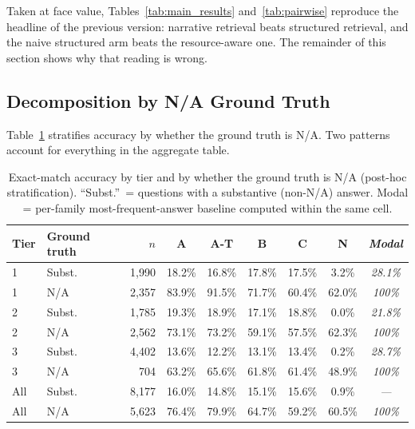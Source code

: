 Taken at face value, Tables~\ref{tab:main_results} and~\ref{tab:pairwise} reproduce the
headline of the previous version: narrative retrieval beats structured retrieval, and
the naive structured arm beats the resource-aware one.  The remainder of this section
shows why that reading is wrong.

\subsection{Decomposition by N/A Ground Truth}
\label{sec:results:na}

Table~\ref{tab:na_split} stratifies accuracy by whether the ground truth is N/A.  Two
patterns account for everything in the aggregate table.

\begin{table}[htbp]
\centering
\small
\caption{Exact-match accuracy by tier and by whether the ground truth is N/A
(post-hoc stratification).  ``Subst.''\ = questions with a substantive (non-N/A)
answer.  Modal = per-family most-frequent-answer baseline computed within the same
cell.}
\label{tab:na_split}
\begin{tabular}{llrccccc>{\itshape}c}
\toprule
Tier & Ground truth & $n$ & A & A-T & B & C & N & Modal \\
\midrule
1 & Subst. & 1{,}990 & 18.2\% & 16.8\% & 17.8\% & 17.5\% & 3.2\% & 28.1\% \\
1 & N/A    & 2{,}357 & 83.9\% & 91.5\% & 71.7\% & 60.4\% & 62.0\% & 100\% \\
2 & Subst. & 1{,}785 & 19.3\% & 18.9\% & 17.1\% & 18.8\% & 0.0\% & 21.8\% \\
2 & N/A    & 2{,}562 & 73.1\% & 73.2\% & 59.1\% & 57.5\% & 62.3\% & 100\% \\
3 & Subst. & 4{,}402 & 13.6\% & 12.2\% & 13.1\% & 13.4\% & 0.2\% & 28.7\% \\
3 & N/A    &   704   & 63.2\% & 65.6\% & 61.8\% & 61.4\% & 48.9\% & 100\% \\
\midrule
All & Subst. & 8{,}177 & 16.0\% & 14.8\% & 15.1\% & 15.6\% & 0.9\% & --- \\
All & N/A    & 5{,}623 & 76.4\% & 79.9\% & 64.7\% & 59.2\% & 60.5\% & 100\% \\
\bottomrule
\end{tabular}
\end{table}

